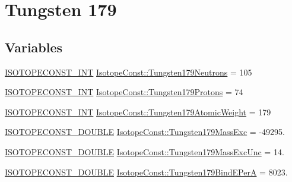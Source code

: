 \hypertarget{group___isotope_const-_tungsten-_w179}{}\section{Tungsten 179}
\label{group___isotope_const-_tungsten-_w179}
\subsection*{Variables}
\begin{DoxyCompactItemize}
\item 
\mbox{\hyperlink{group___isotope_const-_macros_ga5f18360b3e99483a35c32d789e62621c}{I\+S\+O\+T\+O\+P\+E\+C\+O\+N\+S\+T\+\_\+\+I\+NT}} \mbox{\hyperlink{group___isotope_const-_tungsten-_w179_ga36669b1110fd91d6a70111f3350ff87a}{Isotope\+Const\+::\+Tungsten179\+Neutrons}} = 105
\item 
\mbox{\hyperlink{group___isotope_const-_macros_ga5f18360b3e99483a35c32d789e62621c}{I\+S\+O\+T\+O\+P\+E\+C\+O\+N\+S\+T\+\_\+\+I\+NT}} \mbox{\hyperlink{group___isotope_const-_tungsten-_w179_ga15c26a5f9ffa1034252a5a999f022f32}{Isotope\+Const\+::\+Tungsten179\+Protons}} = 74
\item 
\mbox{\hyperlink{group___isotope_const-_macros_ga5f18360b3e99483a35c32d789e62621c}{I\+S\+O\+T\+O\+P\+E\+C\+O\+N\+S\+T\+\_\+\+I\+NT}} \mbox{\hyperlink{group___isotope_const-_tungsten-_w179_ga93d4de06e56b0b51d83f3a36d3d5725c}{Isotope\+Const\+::\+Tungsten179\+Atomic\+Weight}} = 179
\item 
\mbox{\hyperlink{group___isotope_const-_macros_ga8f45a7272ce02c0b4c65c44636ed719a}{I\+S\+O\+T\+O\+P\+E\+C\+O\+N\+S\+T\+\_\+\+D\+O\+U\+B\+LE}} \mbox{\hyperlink{group___isotope_const-_tungsten-_w179_ga00e4fc9ed0d5128bcdb2ff82c2ed1f4b}{Isotope\+Const\+::\+Tungsten179\+Mass\+Exc}} = -\/49295.
\item 
\mbox{\hyperlink{group___isotope_const-_macros_ga8f45a7272ce02c0b4c65c44636ed719a}{I\+S\+O\+T\+O\+P\+E\+C\+O\+N\+S\+T\+\_\+\+D\+O\+U\+B\+LE}} \mbox{\hyperlink{group___isotope_const-_tungsten-_w179_ga2ca4555968a3c64ad64ec2ed1534b6d9}{Isotope\+Const\+::\+Tungsten179\+Mass\+Exc\+Unc}} = 14.
\item 
\mbox{\hyperlink{group___isotope_const-_macros_ga8f45a7272ce02c0b4c65c44636ed719a}{I\+S\+O\+T\+O\+P\+E\+C\+O\+N\+S\+T\+\_\+\+D\+O\+U\+B\+LE}} \mbox{\hyperlink{group___isotope_const-_tungsten-_w179_gaa0e7cdd727678510538f7afa6678854c}{Isotope\+Const\+::\+Tungsten179\+Bind\+E\+PerA}} = 8023.
\item 

\end{DoxyCompactItemize}
